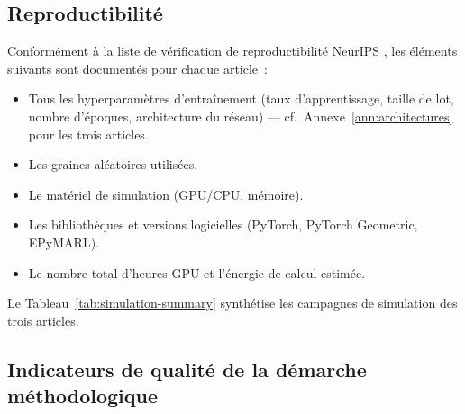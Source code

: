 \subsection{Reproductibilité}

Conformément à la liste de vérification de reproductibilité NeurIPS \cite{Pineau2021Reproducibility}, les éléments suivants sont documentés pour chaque article~:
\begin{itemize}
    \item Tous les hyperparamètres d'entraînement (taux d'apprentissage, taille de lot, nombre d'époques, architecture du réseau) --- cf.\ Annexe~\ref{ann:architectures} pour les trois articles.
    \item Les graines aléatoires utilisées.
    \item Le matériel de simulation (GPU/CPU, mémoire).
    \item Les bibliothèques et versions logicielles (PyTorch, PyTorch Geometric, EPyMARL).
    \item Le nombre total d'heures GPU et l'énergie de calcul estimée.
\end{itemize}

Le Tableau~\ref{tab:simulation-summary} synthétise les campagnes de simulation des trois articles.

\begin{table}[htbp]
\centering
\caption{Synthèse des campagnes de simulation des trois articles.}
\label{tab:simulation-summary}
\end{table}

\subsection{Indicateurs de qualité de la démarche méthodologique}\label{sec:demarche-qualite}

